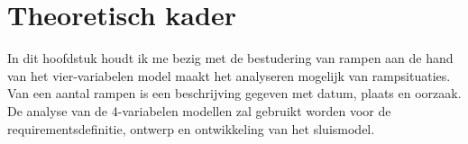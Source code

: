\documentclass{article}
\begin{document}
%	
%	
%	
%	
%	
%		
%	
%	
%	
%	
%	
%	
%	
	
	
	\newpage
	
	
	
	
	
	\section{Theoretisch kader}

	
	In dit hoofdstuk houdt ik me bezig met de bestudering van rampen aan de hand van het vier-variabelen model  maakt het analyseren mogelijk van rampsituaties. Van een aantal rampen is een beschrijving gegeven met datum, plaats en oorzaak. De analyse van de 4-variabelen modellen zal gebruikt worden voor de requirementsdefinitie, ontwerp en ontwikkeling van het sluismodel. 
	
\end{document}
